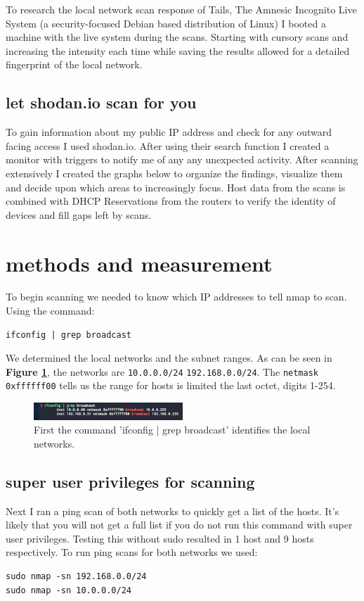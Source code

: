 \documentclass[10pt]{article}
\begin{document}
To research the local network scan response of Tails, The Amnesic Incognito Live System (a security-focused Debian based distribution of Linux) I booted a machine 
with the live system during the scans. Starting with cursory scans and increasing the intensity each time while saving the results allowed for a detailed fingerprint of the local network. 

\subsection*{let shodan.io scan for you}

To gain information about my public IP address and check for any outward facing access I used shodan.io.\cite{shodan}
After using their search function I created a monitor with triggers to notify me of any any unexpected activity. After scanning extensively I created the graphs below to organize the findings, visualize them and decide upon which areas to increasingly 
focus. Host data from the scans is combined with DHCP Reservations from the routers to verify the identity of devices and fill gaps left by scans.

\section*{methods and measurement}
To begin scanning we needed to know which IP addresses to tell nmap to scan. Using the command: \begin{verbatim}ifconfig | grep broadcast\end{verbatim} 
We determined the local networks and the subnet ranges. As can be seen in \textbf{Figure \ref{ifconfig image}}, the networks are \verb|10.0.0.0/24|
\verb|192.168.0.0/24|. The \verb|netmask 0xffffff00| tells us the range for hosts is limited the last octet, digits 1-254.

\begin{figure}[H]
\centering
\includegraphics[width=0.5\textwidth]{ifconfig.png}
\caption{First the command 'ifconfig | grep broadcast' identifies the local networks.}\label{ifconfig image}
\end{figure}

\medskip
\subsection*{super user privileges for scanning}
Next I ran a ping scan of both networks to quickly get a list of the hosts. It's likely that you will not get a full list if you do not run this command with super user privileges.
Testing this without sudo resulted in 1 host and 9 hosts respectively. To run ping scans for both networks we used:
\begin{verbatim}
sudo nmap -sn 192.168.0.0/24
sudo nmap -sn 10.0.0.0/24 \end{verbatim}
\end{document}
